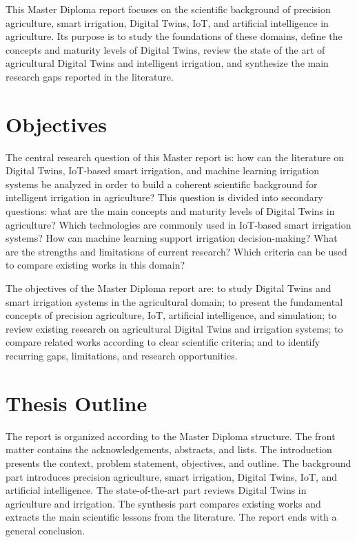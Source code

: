 This Master Diploma report focuses on the scientific background of precision agriculture, smart irrigation, Digital Twins, IoT, and artificial intelligence in agriculture. Its purpose is to study the foundations of these domains, define the concepts and maturity levels of Digital Twins, review the state of the art of agricultural Digital Twins and intelligent irrigation, and synthesize the main research gaps reported in the literature.

\section{Objectives}

The central research question of this Master report is: how can the literature on Digital Twins, IoT-based smart irrigation, and machine learning irrigation systems be analyzed in order to build a coherent scientific background for intelligent irrigation in agriculture? This question is divided into secondary questions: what are the main concepts and maturity levels of Digital Twins in agriculture? Which technologies are commonly used in IoT-based smart irrigation systems? How can machine learning support irrigation decision-making? What are the strengths and limitations of current research? Which criteria can be used to compare existing works in this domain?

The objectives of the Master Diploma report are: to study Digital Twins and smart irrigation systems in the agricultural domain; to present the fundamental concepts of precision agriculture, IoT, artificial intelligence, and simulation; to review existing research on agricultural Digital Twins and irrigation systems; to compare related works according to clear scientific criteria; and to identify recurring gaps, limitations, and research opportunities.

\section{Thesis Outline}

The report is organized according to the Master Diploma structure. The front matter contains the acknowledgements, abstracts, and lists. The introduction presents the context, problem statement, objectives, and outline. The background part introduces precision agriculture, smart irrigation, Digital Twins, IoT, and artificial intelligence. The state-of-the-art part reviews Digital Twins in agriculture and irrigation. The synthesis part compares existing works and extracts the main scientific lessons from the literature. The report ends with a general conclusion.

